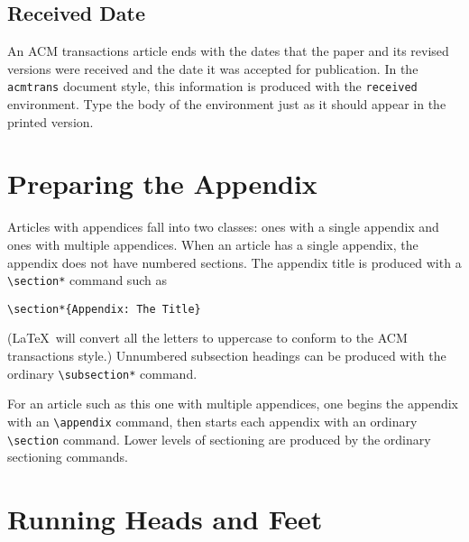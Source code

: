 \subsection{Received Date}

An ACM transactions article ends with the dates that the paper and its
revised versions were received and the date it was accepted for
publication.  In the {\tt acmtrans} document style, this information is
produced with the {\tt received} environment.  Type the body of the
environment just as it should appear in the printed version.

\appendix

\section{Preparing the Appendix}

Articles with appendices fall into two classes: ones with a single
appendix and ones with multiple appendices.  When an article
has a single appendix, the appendix does not have numbered
sections.  The appendix title is produced with a
\verb|\section*| command such as
\begin{verbatim}
\section*{Appendix: The Title}
\end{verbatim}
(\LaTeX\ will convert all the letters to uppercase to conform
to the ACM transactions style.)  Unnumbered subsection
headings can be produced with the ordinary \verb|\subsection*|
command.

For an article such as this one with multiple appendices, one begins
the appendix with an \verb|\appendix| command, then starts each
appendix with an ordinary \verb|\section| command.  Lower levels of
sectioning are produced by the ordinary sectioning commands.

\section{Running Heads and Feet}

